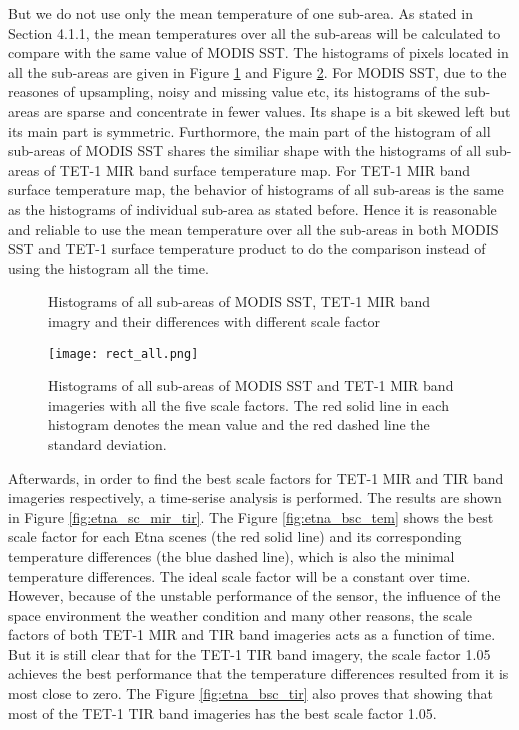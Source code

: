 \noindent But we do not use only the mean temperature of one sub-area. As stated in Section 4.1.1, the mean temperatures over all the sub-areas will be calculated to compare with the same value of MODIS SST. The histograms of pixels located in all the sub-areas are given in Figure \ref{fig:hist_all_rect} and Figure \ref{fig:rect_all_sc_all}. For MODIS SST, due to the reasones of upsampling, noisy and missing value etc, its histograms of the sub-areas are sparse and concentrate in fewer values. Its shape is a bit skewed left but its main part is symmetric. Furthormore, the main part of the histogram of all sub-areas of MODIS SST shares the similiar shape with the histograms of all sub-areas of TET-1 MIR band surface temperature map. For TET-1 MIR band surface temperature map, the behavior of histograms of all sub-areas is the same as the histograms of individual sub-area as stated before. Hence it is reasonable and reliable to use the mean temperature over all the sub-areas in both MODIS SST and TET-1 surface temperature product to do the comparison instead of using the histogram all the time.\\

\begin{figure}[!htbp]
\centering
{}
\vspace{0.1in}
\caption{Histograms of all sub-areas of MODIS SST, TET-1 MIR band imagry and their differences with different scale factor}
\label{fig:hist_all_rect}
\end{figure}

\begin{figure}[!htbp]
\centering
\texttt{[image: rect\_all.png]}
\caption{Histograms of all sub-areas of MODIS SST and TET-1 MIR band imageries with all the five scale factors. The red solid line in each histogram denotes the mean value and the red dashed line the standard deviation.}
\label{fig:rect_all_sc_all}
\end{figure}

\noindent Afterwards, in order to find the best scale factors for TET-1 MIR and TIR band imageries respectively, a time-serise analysis is performed. The results are shown in Figure \ref{fig:etna_sc_mir_tir}. The Figure \ref{fig:etna_bsc_tem} shows the best scale factor for each Etna scenes (the red solid line) and its corresponding temperature differences (the blue dashed line), which is also the minimal temperature differences. The ideal scale factor will be a constant over time. However, because of the unstable performance of the sensor, the influence of the space environment the weather condition and many other reasons, the scale factors of both TET-1 MIR and TIR band imageries acts as a function of time. But it is still clear that for the TET-1 TIR band imagery, the scale factor 1.05 achieves the best performance that the temperature differences resulted from it is most close to zero. The Figure \ref{fig:etna_bsc_tir} also proves that showing that most of the TET-1 TIR band imageries has the best scale factor 1.05.\\

